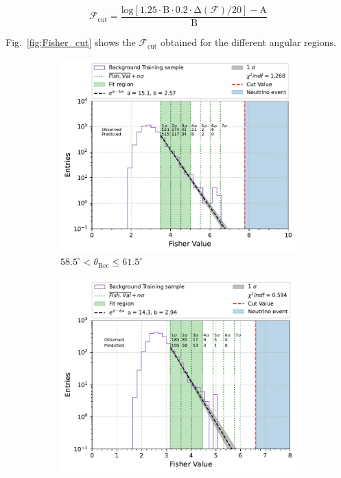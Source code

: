 \begin{equation}
  \label{eq:fisher_poly_cut}
  \mathcal{F}_{\text{cut}} = \mathrm{\frac{log[1.25 \cdot B \cdot 0.2 \cdot \Delta (\mathcal{F}) / 20] - A}{B} }
\end{equation}

Fig.~\ref{fig:Fisher_cut} shows the $\mathcal{F}_{\text{cut}}$ obtained for the different angular regions. 
\FloatBarrier
\begin{figure}[h!]
  \centering
   \begin{subfigure}[l]{.48\textwidth}
     \centering
     \includegraphics[width=\linewidth]{thesis_figures/Nu_analysis/Fisher_plots/Fisher_fit_region_58.5_61.5.pdf}
     \caption{$ 58.5^{\circ} <\theta_{\text{Rec}} \leq 61.5^{\circ}$}
   \end{subfigure}
   \begin{subfigure}[r]{.48\textwidth}
     \centering
     \includegraphics[width=\linewidth]{thesis_figures/Nu_analysis/Fisher_plots/Fisher_fit_region_61.5_64.5.pdf}

\end{subfigure}
\end{figure}
